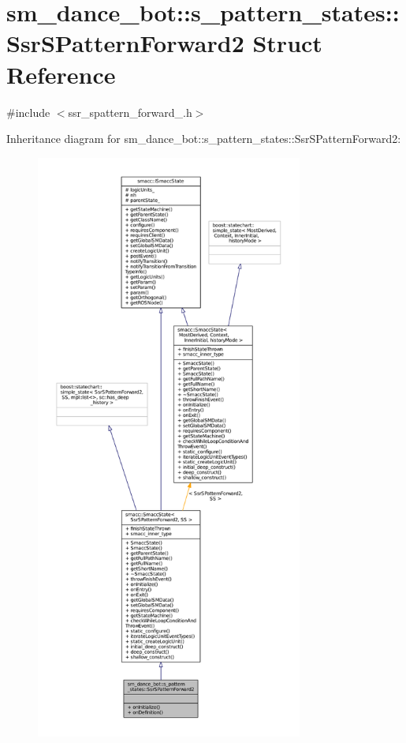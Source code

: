 \hypertarget{structsm__dance__bot_1_1s__pattern__states_1_1SsrSPatternForward2}{}\section{sm\+\_\+dance\+\_\+bot\+:\+:s\+\_\+pattern\+\_\+states\+:\+:Ssr\+S\+Pattern\+Forward2 Struct Reference}
\label{structsm__dance__bot_1_1s__pattern__states_1_1SsrSPatternForward2}


{\ttfamily \#include $<$ssr\+\_\+spattern\+\_\+forward\+\_.\+h$>$}



Inheritance diagram for sm\+\_\+dance\+\_\+bot\+:\+:s\+\_\+pattern\+\_\+states\+:\+:Ssr\+S\+Pattern\+Forward2\+:
\nopagebreak
\begin{figure}[H]
\begin{center}
\leavevmode
\includegraphics[height=550pt]{structsm__dance__bot_1_1s__pattern__states_1_1SsrSPatternForward2__inherit__graph}
\end{center}
\end{figure}


